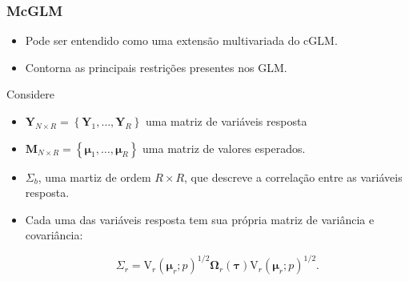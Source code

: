 \documentclass[10pt,
  aspectratio=169,
  serif,
  mathserif,
  professionalfont,
  compress,
  handout,
  ]{beamer}\usepackage[]{graphicx}\usepackage[]{color}
\begin{document}

\begin{frame}
  \frametitle{McGLM}
  \begin{itemize}
    \itemsep 2ex
  
  \item Pode ser entendido como uma extensão multivariada do cGLM. 
  
  \item Contorna as principais restrições presentes nos GLM. 

  \end{itemize}
  
  Considere
  
  \begin{itemize}
  \item $\boldsymbol{Y}_{N \times R} = \left \{ \boldsymbol{Y}_1, \dots, \boldsymbol{Y}_R \right \}$ uma matriz de variáveis resposta
  
  \item $\boldsymbol{M}_{N \times R} = \left \{ \boldsymbol{\mu}_1, \dots, \boldsymbol{\mu}_R \right \}$ uma matriz de valores esperados.
  
  \item $\Sigma_b$, uma martiz de ordem $R \times R$, que descreve a correlação entre as variáveis resposta.
  
  \item Cada uma das variáveis resposta tem sua própria matriz de variância e covariância:

\begin{equation}
\Sigma_r =
\mathrm{V}_r\left(\boldsymbol{\mu}_r; p\right)^{1/2}\boldsymbol{\Omega}_r\left(\boldsymbol{\tau}\right)\mathrm{V}_r\left(\boldsymbol{\mu}_r; p\right)^{1/2}.
\end{equation}
 
\end{itemize}

\end{frame}

\end{document}
